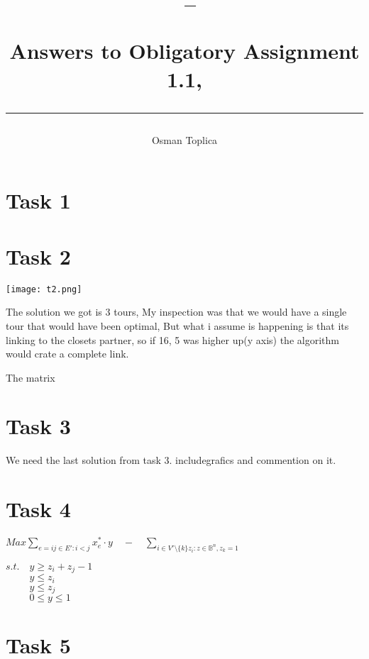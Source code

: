 \documentclass[a4paper,10pt]{article}
\title{\begin{flushleft}
\vspace{-4ex}
\courseid~-- \coursename \\[0.2cm]
{\Large Answers to Obligatory Assignment 1.1, \term \\[3ex]
\hrule}
\end{flushleft}
}
\date{}
\author{Osman Toplica}
\begin{document}
\maketitle

\section*{Task 1}



\newpage
\section*{Task 2}

\texttt{[image: t2.png]}

The solution we got is 3 tours, My inspection was that we would have a single tour that would have been optimal, But what i assume is happening is that its linking to the closets partner, so if 16, 5 was higher up(y axis) the algorithm would crate a complete link.

The matrix 
\newpage
\section*{Task 3}
We need the last solution from task 3. includegrafics and commention on it.

\newpage
\section*{Task 4}

$Max \sum\limits_{e=ij \in E' : i<j} x^*_e \cdot y \quad - \quad \sum\limits_{i \in V'\setminus \{k\} z_i : z \in \mathbb{B}^n, z_k = 1}$

$s.t.\quad y \geq z_i+z_j - 1$\\
$\phantom{s.t.} \quad y \leq z_i$\\
$\phantom{s.t.} \quad y \leq z_j$\\
$\phantom{s.t.} \quad 0 \leq y \leq 1$
\newpage

\section*{Task 5}


\end{document}
